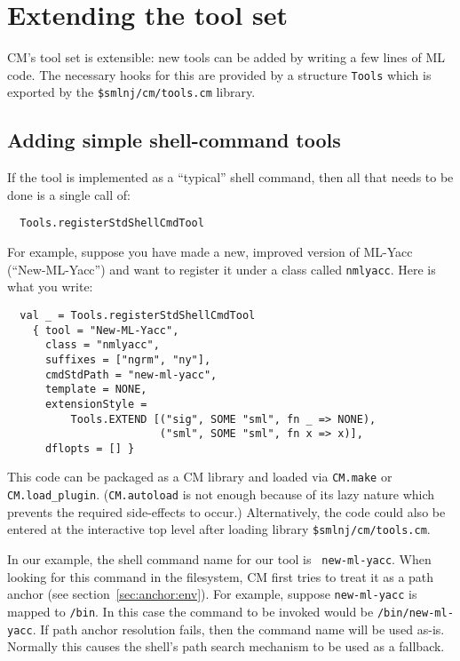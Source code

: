 
\section{Extending the tool set}
\label{sec:moretools}

CM's tool set is extensible: new tools can be added by writing a few
lines of ML code.  The necessary hooks for this are provided by a
structure {\tt Tools} which is exported by the {\tt \$smlnj/cm/tools.cm}
library.

\subsection{Adding simple shell-command tools}
\label{sec:addshellclass}

If the tool is implemented as a ``typical'' shell command, then all
that needs to be done is a single call of:

\begin{verbatim}
  Tools.registerStdShellCmdTool
\end{verbatim}

For example, suppose you have made a
new, improved version of ML-Yacc (``New-ML-Yacc'') and want to
register it under a class called {\tt nmlyacc}.  Here is what you
write:

\begin{verbatim}
  val _ = Tools.registerStdShellCmdTool
    { tool = "New-ML-Yacc",
      class = "nmlyacc",
      suffixes = ["ngrm", "ny"],
      cmdStdPath = "new-ml-yacc",
      template = NONE,
      extensionStyle =
          Tools.EXTEND [("sig", SOME "sml", fn _ => NONE),
                        ("sml", SOME "sml", fn x => x)],
      dflopts = [] }
\end{verbatim}

This code can be packaged as a CM library and loaded via {\tt CM.make}
or {\tt CM.load\_plugin}.  ({\tt CM.autoload} is not enough because of
its lazy nature which prevents the required side-effects to occur.)
Alternatively, the code could also be entered at the interactive top
level after loading library {\tt \$smlnj/cm/tools.cm}.

In our example, the shell command name for our tool is {\tt
new-ml-yacc}.  When looking for this command in the filesystem, CM
first tries to treat it as a path anchor (see
section~\ref{sec:anchor:env}).  For example, suppose {\tt new-ml-yacc} is
mapped to {\tt /bin}.  In this case the command to be
invoked would be {\tt /bin/new-ml-yacc}.  If path anchor resolution
fails, then the command name will be used as-is.  Normally this
causes the shell's path search mechanism to be used as a fallback.

